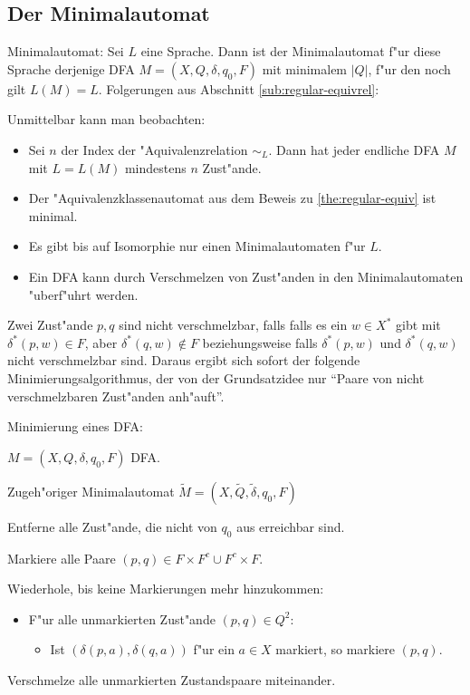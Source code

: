 \subsection{Der Minimalautomat}
\label{sub:miniauto}
 Minimalautomat:{
  Sei $L$ eine Sprache. Dann ist der Minimalautomat f"ur diese Sprache
  derjenige DFA $M=(X,Q,\delta,q_0,F)$ mit minimalem $|Q|$, f"ur den noch
  gilt $L(M)=L$.
  }
\remark Folgerungen aus Abschnitt \ref{sub:regular-equivrel}:{
  Unmittelbar kann man beobachten:
  \begin{itemize}
    \item Sei $n$ der Index der "Aquivalenzrelation $\sim_L$. Dann hat
      jeder endliche DFA $M$ mit $L=L(M)$ mindestens $n$ Zust"ande.
    \item Der "Aquivalenzklassenautomat aus dem Beweis zu
      \ref{the:regular-equiv} ist minimal.
    \item Es gibt bis auf Isomorphie nur einen Minimalautomaten f"ur $L$.
    \item Ein DFA kann durch Verschmelzen von Zust"anden in den Minimalautomaten
      "uberf"uhrt werden.
    \end{itemize}
  Zwei Zust"ande $p,q$ sind nicht verschmelzbar, falls 
  falls es ein $w\in X^*$ gibt mit $\delta^*(p,w)\in F$, aber
  $\delta^*(q,w)\not\in F$ beziehungsweise falls $\delta^*(p,w)$ und 
  $\delta^*(q,w)$ nicht verschmelzbar sind. Daraus ergibt sich sofort
  der folgende Minimierungsalgorithmus, der von der Grundsatzidee nur 
  ``Paare von nicht verschmelzbaren Zust"anden anh"auft''.
  }
\algorithm Minimierung eines DFA:{
  \given $M=(X,Q,\delta,q_0,F)$ DFA.
  
  \aim Zugeh"origer Minimalautomat $\tilde M=(X,\tilde Q,\tilde\delta,q_0,F)$
  
  \begin{proc}
    \item Entferne alle Zust"ande, die nicht von $q_0$ aus erreichbar sind.
    \item Markiere alle Paare $(p,q)\in F\times F^c\cup F^c\times F$.
    \item Wiederhole, bis keine Markierungen mehr hinzukommen:
      \begin{itemize}
        \item
       	  F"ur alle unmarkierten Zust"ande $(p,q)\in Q^2$:
	  \begin{itemize}
	    \item
       	      Ist $(\delta(p,a),\delta(q,a))$ f"ur ein $a\in X$ markiert, so
       	      markiere $(p,q)$.
	    \end{itemize}
        \end{itemize}
    \item Verschmelze alle unmarkierten Zustandspaare miteinander.
    \end{proc}
  }
